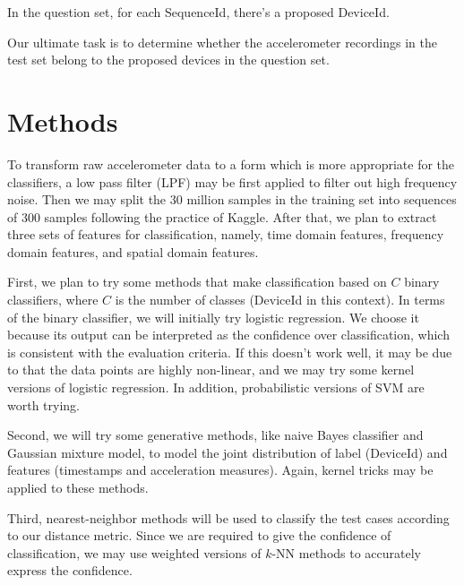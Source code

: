 \documentclass[12pt]{article}
\begin{document}
In the question set, for each SequenceId, there's a proposed DeviceId.

Our ultimate task is to determine whether the accelerometer recordings in the test set belong to the proposed devices in the question set.


\section{Methods}
To transform raw accelerometer data to a form which is more appropriate for the classifiers, a low pass filter (LPF) may be first applied to filter out high frequency noise. Then we may split the 30 million samples in the training set into sequences of 300 samples following the practice of Kaggle. After that, we plan to extract three sets of features for classification, namely, time domain features, frequency domain features, and spatial domain features.

First, we plan to try some methods that make classification based on $C$ binary classifiers, where $C$ is the number of classes (DeviceId in this context). In terms of the binary classifier, we will initially try logistic regression. We choose it because its output can be interpreted as the confidence over classification, which is consistent with the evaluation criteria. If this doesn't work well, it may be due to that the data points are highly non-linear, and we may try some kernel versions of logistic regression. In addition, probabilistic versions of SVM are worth trying.

Second, we will try some generative methods, like naive Bayes classifier and Gaussian mixture model, to model the joint distribution of label (DeviceId) and features (timestamps and acceleration measures). Again, kernel tricks may be applied to these methods.

Third, nearest-neighbor methods will be used to classify the test cases according to our distance metric. Since we are required to give the confidence of classification, we may use weighted versions of $k$-NN methods to accurately express the confidence.
\end{document}
